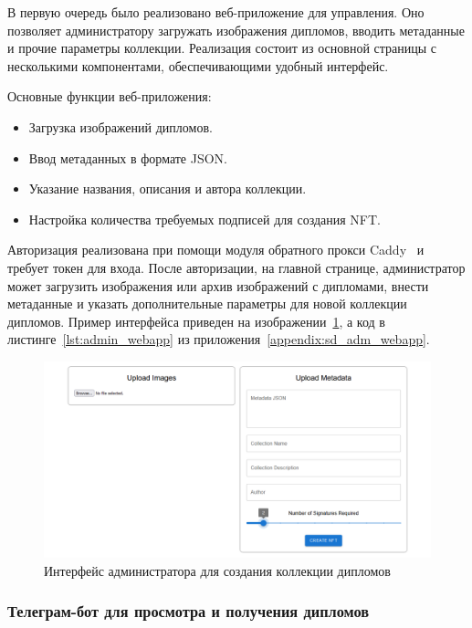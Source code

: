 В первую очередь было реализовано веб-приложение для управления. Оно позволяет администратору загружать изображения дипломов, вводить метаданные и прочие параметры коллекции. Реализация состоит из основной страницы с несколькими компонентами, обеспечивающими удобный интерфейс.

Основные функции веб-приложения:
\begin{itemize}
    \item Загрузка изображений дипломов.
    \item Ввод метаданных в формате JSON.
    \item Указание названия, описания и автора коллекции.
    \item Настройка количества требуемых подписей для создания NFT.
\end{itemize}

Авторизация реализована при помощи модуля обратного прокси Caddy~\cite{bib:caddy} и требует токен для входа. После авторизации, на главной странице, администратор может загрузить изображения или архив изображений с дипломами, внести метаданные и указать дополнительные параметры для новой коллекции дипломов. Пример интерфейса приведен на изображении~\ref{fig:admin_webapp}, а код в листинге~\ref{lst:admin_webapp} из приложения~\ref{appendix:sd_adm_webapp}.

\begin{figure}[H]
	\centering
	\includegraphics[width=1\textwidth]{images/3.admin_webapp.png}
	\parskip=6pt
	\caption{Интерфейс администратора для создания коллекции дипломов}
	\label{fig:admin_webapp}
\end{figure}

\subsubsection{Телеграм-бот для просмотра и получения дипломов}

